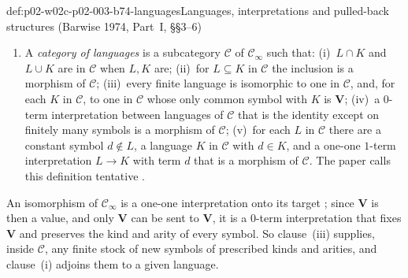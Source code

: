 \begin{hbdefinition}{def:p02-w02c-p02-003-b74-languages}{Languages, interpretations and pulled-back structures (Barwise 1974, Part~I, \S\S3--6)}
\begin{enumerate}
      \(N_\alpha=\{b:(b,a_1,\ldots,a_k)\in(\mathbf V^{\alpha})^{\mathfrak N}\}\),
      with \(R^{\mathfrak N^{-\alpha}}=\{\bar b\in N_\alpha^{n}:(\bar b,\bar a)\in(R^{\alpha})^{\mathfrak N}\}\),
      and with \(f^{\mathfrak N^{-\alpha}}\) the restriction to
      \(N_\alpha^{n}\) of \(\bar b\mapsto(f^{\alpha})^{\mathfrak N}(\bar b,\bar a)\),
      a value outside \(N_\alpha\) counting as undefined.  \(\mathfrak N\) is
      \emph{\(\alpha\)-invertible} when \(\mathfrak N^{-\alpha}\) is an
      \(L\)-structure, that is, when \(N_\alpha\) is closed under these
      functions and contains the value of each constant symbol
      \cite[Part~I, \S5, p.~231]{Barwise1974Axioms}.  For an inclusion the
      pull-back is the reduct; for \(\alpha:L\to L\cup\{U\}\) that sends
      \(\mathbf V\) to a new unary \(U\) and fixes the other symbols, it is
      the relativization to \(U\) when \(U\) is closed under the functions
      of \(L\) \cite[Part~I, \S5, 5.1--5.2, p.~231]{Barwise1974Axioms}.
\item A \emph{category of languages} is a subcategory \(\mathcal C\) of
      \(\mathcal C_\infty\) such that: (i)~\(L\cap K\) and \(L\cup K\) are
      in \(\mathcal C\) when \(L,K\) are; (ii)~for \(L\subseteq K\) in
      \(\mathcal C\) the inclusion is a morphism of \(\mathcal C\);
      (iii)~every finite language is isomorphic to one in \(\mathcal C\),
      and, for each \(K\) in \(\mathcal C\), to one in \(\mathcal C\) whose
      only common symbol with \(K\) is \(\mathbf V\); (iv)~a \(0\)-term
      interpretation between languages of \(\mathcal C\) that is the
      identity except on finitely many symbols is a morphism of
      \(\mathcal C\); (v)~for each \(L\) in \(\mathcal C\) there are a
      constant symbol \(d\notin L\), a language \(K\) in \(\mathcal C\) with
      \(d\in K\), and a one-one \(1\)-term interpretation \(L\to K\) with term
      \(d\) that is a morphism of \(\mathcal C\).  The paper calls this
      definition tentative \cite[Part~I, \S6, 6.2, pp.~233--234]{Barwise1974Axioms}.
\end{enumerate}
\end{hbdefinition}

An isomorphism of \(\mathcal C_\infty\) is a one-one interpretation onto its
target \cite[Part~I, \S4, 4.3, p.~230]{Barwise1974Axioms}; since
\(\mathbf V\) is then a value, and only \(\mathbf V\) can be sent to
\(\mathbf V\), it is a \(0\)-term interpretation that fixes \(\mathbf V\)
and preserves the kind and arity of every symbol.  So clause~(iii)
supplies, inside \(\mathcal C\), any finite stock of new symbols of
prescribed kinds and arities, and clause~(i) adjoins them to a given
language.

